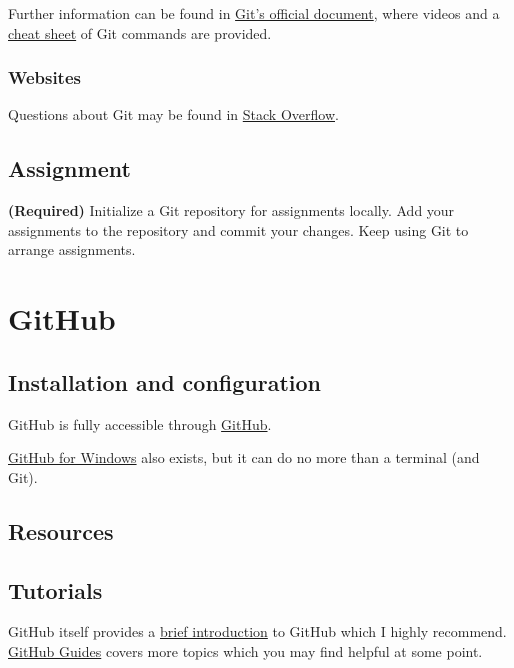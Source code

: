 \documentclass[english]{pkupaper}
\begin{document}
Further information can be found in \href{https://git-scm.com/doc}{Git's official document}, where videos and a \href{https://services.github.com/on-demand/downloads/github-git-cheat-sheet.pdf}{cheat sheet} of Git commands are provided.

\subsubsection{Websites}

Questions about Git may be found in \href{https://stackoverflow.com/}{Stack Overflow}.

\subsection{Assignment}

\begin{thmquestion}
\textbf{(Required)} Initialize a Git repository for assignments locally. Add your assignments to the repository and commit your changes. Keep using Git to arrange assignments.
\end{thmquestion}

\section{GitHub}

\subsection{Installation and configuration}

GitHub is fully accessible through \href{https://github.com/}{GitHub}.

\href{https://desktop.github.com/}{GitHub for Windows} also exists, but it can do no more than a terminal (and Git).

\subsection{Resources}

\subsection{Tutorials}

GitHub itself provides a \href{https://guides.github.com/activities/hello-world/}{brief introduction} to GitHub which I highly recommend. \href{https://guides.github.com/}{GitHub Guides} covers more topics which you may find helpful at some point.
\end{document}
